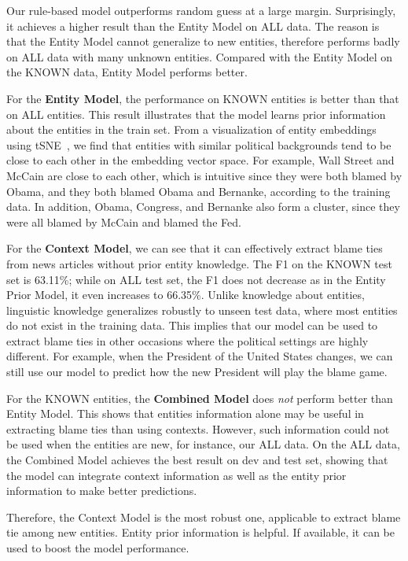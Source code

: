 \documentclass[letterpaper]{article} %
\begin{document}
Our rule-based model outperforms random guess at a large margin. Surprisingly, it achieves a higher result than the Entity Model on ALL data. The reason is that the Entity Model cannot generalize to new entities, therefore performs badly on ALL data with many unknown entities. Compared with the Entity Model on the KNOWN data, Entity Model performs better.

For the \textbf{Entity Model}, the performance on KNOWN entities is better than that on ALL entities. This result illustrates that the model learns prior information about the entities in the train set. From a visualization of entity embeddings using tSNE~\cite{maaten2008visualizing}, we find that entities with similar political backgrounds tend to be close to each other in the embedding vector space. For example, Wall Street and McCain are close to each other, which is intuitive since they were both blamed by Obama, and they both blamed Obama and Bernanke, according to the training data. In addition, Obama, Congress, and Bernanke also form a cluster, since they were all blamed by McCain and blamed the Fed.

For the \textbf{Context Model}, we can see that it can effectively extract blame ties from news articles without prior entity knowledge. The F1 on the KNOWN test set is 63.11\%; while on ALL test set, the F1 does not decrease as in the Entity Prior Model, it even increases to 66.35\%. Unlike knowledge about entities, linguistic knowledge generalizes robustly to unseen test data, where most entities do not exist in the training data. This implies that our model can be used to extract blame ties in other occasions where the political settings are highly different. For example, when the President of the United States changes, we can still use our model to predict how the new President will play the blame game.

For the KNOWN entities, the \textbf{Combined Model} does \textit{not} perform better than Entity Model. This shows that entities information alone may be useful in extracting blame ties than using contexts. However, such information could not be used when the entities are new, for instance, our ALL data. On the ALL data, the Combined Model achieves the best result on dev and test set, showing that the model can integrate context information as well as the entity prior information to make better predictions.

Therefore, the Context Model is the most robust one, applicable to extract blame tie among new entities. Entity prior information is helpful. If available, it can be used to boost the model performance.
\end{document}
